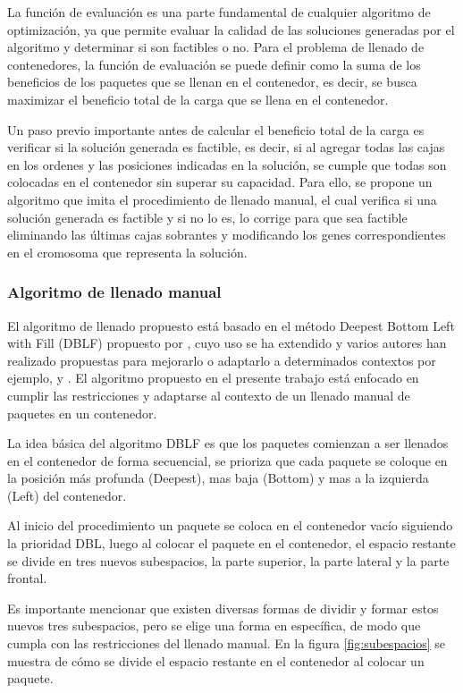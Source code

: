 \documentclass[openany]{article}
\begin{document}
La función de evaluación es una parte fundamental de cualquier algoritmo de optimización, ya que permite evaluar la calidad de las soluciones generadas por el algoritmo y determinar si son factibles o no. Para el problema de llenado de contenedores, la función de evaluación se puede definir como la suma de los beneficios de los paquetes que se llenan en el contenedor, es decir, se busca maximizar el beneficio total de la carga que se llena en el contenedor.

Un paso previo importante antes de calcular el beneficio total de la carga es verificar si la solución generada es factible, es decir, si al agregar todas las cajas en los ordenes y las posiciones indicadas en la solución, se cumple que todas son colocadas en el contenedor sin superar su capacidad. Para ello, se propone un algoritmo que imita el procedimiento de llenado manual, el cual verifica si una solución generada es factible y si no lo es, lo corrige para que sea factible eliminando las últimas cajas sobrantes y modificando los genes correspondientes en el cromosoma que representa la solución.

\subsubsection{Algoritmo de llenado manual}

El algoritmo de llenado propuesto está basado en el método Deepest Bottom Left with Fill (DBLF) propuesto por \textcite{karabulut2004hybrid}, cuyo uso se ha extendido y varios autores han realizado propuestas para mejorarlo o adaptarlo a determinados contextos por ejemplo, \textcite{wang2010hybrid} y \textcite{kang2012hybrid}. El algoritmo propuesto en el presente trabajo está enfocado en cumplir las restricciones y adaptarse al contexto de un llenado manual de paquetes en un contenedor.

La idea básica del algoritmo DBLF es que los paquetes comienzan a ser llenados en el contenedor de forma secuencial, se prioriza que cada paquete se coloque en la posición más profunda (Deepest), mas baja (Bottom) y mas a la izquierda (Left) del contenedor.

Al inicio del procedimiento un paquete se coloca en el contenedor vacío siguiendo la prioridad DBL, luego al colocar el paquete en el contenedor, el espacio restante se divide en tres nuevos subespacios, la parte superior, la parte lateral y la parte frontal.

Es importante mencionar que existen diversas formas de dividir y formar estos nuevos tres subespacios, pero se elige una forma en específica, de modo que cumpla con las restricciones del llenado manual. En la figura \ref{fig:subespacios} se muestra de cómo se divide el espacio restante en el contenedor al colocar un paquete.
\end{document}
